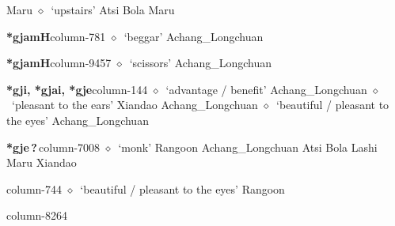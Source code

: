          Maru 
\hspace{1ex}
         $\diamond$~`upstairs'
         Atsi 
\hspace{1ex}
         Bola 
\hspace{1ex}
         Maru 
  \item {\footnotesize \textbf{*gjamH}}{\tiny column-781}
         $\diamond$~`beggar'
         Achang\_Longchuan 
  \item {\footnotesize \textbf{*gjamH}}{\tiny column-9457}
         $\diamond$~`scissors'
         Achang\_Longchuan 
  \item {\footnotesize \textbf{*gji, *gjai, *gje}}{\tiny column-144}
         $\diamond$~`advantage / benefit'
         Achang\_Longchuan 
\hspace{1ex}
         $\diamond$~`pleasant to the ears'
         Xiandao 
\hspace{1ex}
         Achang\_Longchuan 
\hspace{1ex}
         $\diamond$~`beautiful / pleasant to the eyes'
         Achang\_Longchuan 
  \item {\footnotesize \textbf{*gje\,?\,}}{\tiny column-7008}
         $\diamond$~`monk'
         Rangoon 
\hspace{1ex}
         Achang\_Longchuan 
\hspace{1ex}
         Atsi 
\hspace{1ex}
         Bola 
\hspace{1ex}
         Lashi 
\hspace{1ex}
         Maru 
\hspace{1ex}
         Xiandao 
  \item {\footnotesize \textbf{}}{\tiny column-744}
         $\diamond$~`beautiful / pleasant to the eyes'
         Rangoon 
  \item {\footnotesize \textbf{}}{\tiny column-8264}
